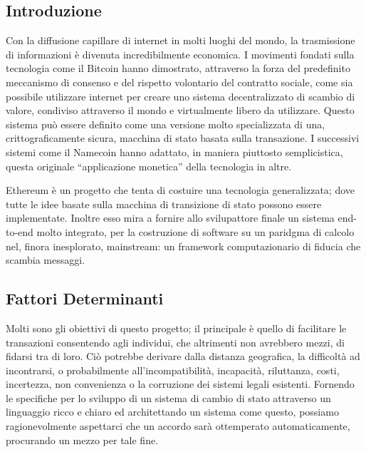 \documentclass[9pt,oneside]{amsart}
\begin{document}
\setlength{\columnsep}{20pt}
\begin{multicols}{2}

\section{Introduzione}\label{sec:introduction}

Con la diffusione capillare di internet in molti luoghi del mondo, la trasmissione di informazioni è divenuta incredibilmente economica. I movimenti fondati sulla tecnologia come il Bitcoin hanno dimostrato, attraverso la forza del predefinito meccanismo di consenso e del rispetto volontario del contratto sociale, come sia possibile utilizzare internet per creare uno sistema decentralizzato di scambio di valore, condiviso attraverso il mondo e virtualmente libero da utilizzare. Questo sistema può essere definito come una versione molto specializzata di una, crittograficamente sicura, macchina di stato basata sulla transazione. I successivi sistemi come il Namecoin hanno adattato, in maniera piuttosto semplicistica, questa originale ``applicazione monetica'' della tecnologia in altre. 

Ethereum è un progetto che tenta di costuire una tecnologia generalizzata; dove tutte le idee basate sulla macchina di transizione di stato possono essere implementate. Inoltre esso mira a fornire allo svilupattore finale un sistema end-to-end molto integrato, per la costruzione di software su un paridgma di calcolo nel, finora inesplorato,  mainstream: un framework computazionario di fiducia che scambia messaggi.

\subsection{Fattori Determinanti} \label{ch:driving}

Molti sono gli obiettivi di questo progetto; il principale è quello di facilitare le transazioni consentendo agli individui, che altrimenti non avrebbero mezzi, di fidarsi tra di loro. Ciò potrebbe derivare dalla distanza geografica, la difficoltà ad incontrarsi, o probabilmente all'incompatibilità, incapacità, riluttanza, costi, incertezza, non convenienza o la corruzione dei sistemi legali esistenti. Fornendo le specifiche per lo sviluppo di un sistema di cambio di stato attraverso un linguaggio ricco e chiaro ed architettando un sistema come questo, possiamo ragionevolmente aspettarci che un accordo sarà ottemperato automaticamente, procurando un mezzo per tale fine.


\end{multicols}
\end{document}
